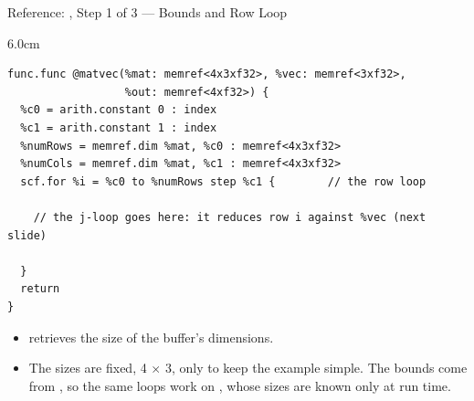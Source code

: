 \documentclass[aspectratio=169,10pt]{beamer}
\begin{document}
\begin{frame}[fragile]{Reference: , Step 1 of 3 --- Bounds and Row Loop}
  \begin{stage}{6.0cm}
\begin{lstlisting}[language=mlir]
func.func @matvec(%mat: memref<4x3xf32>, %vec: memref<3xf32>,
                  %out: memref<4xf32>) {
  %c0 = arith.constant 0 : index
  %c1 = arith.constant 1 : index
  %numRows = memref.dim %mat, %c0 : memref<4x3xf32>
  %numCols = memref.dim %mat, %c1 : memref<4x3xf32>
  scf.for %i = %c0 to %numRows step %c1 {        // the row loop

    // the j-loop goes here: it reduces row i against %vec (next slide)

  }
  return
}
\end{lstlisting}
  \vspace{0.4em}
  \begin{itemize}
    \item<2->  retrieves the size of the buffer's dimensions.
    \item<3-> The sizes are fixed, 4 $\times$ 3, only to keep the example
      simple. The bounds come from , so the same loops work on
      , whose sizes are known only at run time.
  \end{itemize}
  \end{stage}
\end{frame}
\end{document}
